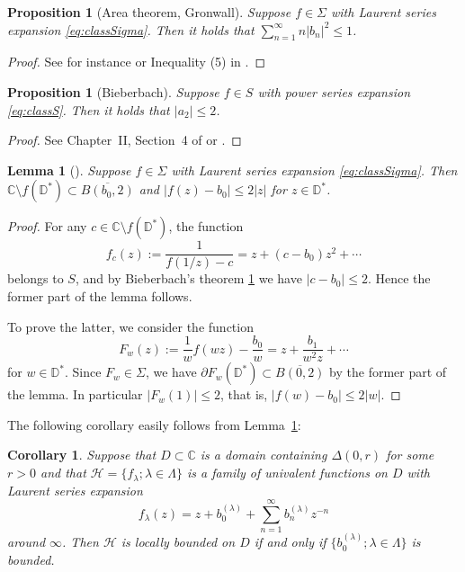 \documentclass[preprint,12pt]{elsarticle}
\newtheorem{prop}[thm]{Proposition}
\newtheorem{lem}[thm]{Lemma}
\newtheorem{cor}[thm]{Corollary}
\theoremstyle{definition}
\newcommand{\C}{\mathbb{C}}
\newcommand{\disk}{\mathbb{D}}
\begin{document}
\begin{prop}[Area theorem, Gronwall] \label{prop:areathm}
Suppose $f \in \Sigma$ with Laurent series expansion \eqref{eq:classSigma}.
Then it holds that $\sum_{n=1}^{\infty}n\lvert b_n \rvert^2 \leq 1$.
\end{prop}

\begin{proof}
See for instance \cite[Theorem~II.4.1]{Go69}
or Inequality (5) in \cite[Section~1.2]{Po75}.
\end{proof}

\begin{prop}[Bieberbach] \label{prop:Bie}
Suppose $f \in S$ with power series expansion \eqref{eq:classS}.
Then it holds that $\lvert a_2 \rvert \leq 2$.
\end{prop}

\begin{proof}
See Chapter~II, Section~4 of \cite{Go69} or \cite[Theorem~1.5]{Po75}.
\end{proof}

\begin{lem}[{\cite[Theorem~II.4.3 and Lemma~V.2.2]{Go69}}] \label{lem:Sigma}
Suppose $f \in \Sigma$ with Laurent series expansion \eqref{eq:classSigma}.
Then $\C \setminus f(\disk^*) \subset \overline{B(b_0, 2)}$
and $\lvert f(z)-b_0 \rvert \leq 2\lvert z \rvert$ for $z \in \disk^*$.
\end{lem}

\begin{proof}
For any $c \in \C \setminus f(\disk^*)$, the function
\[
f_c(z):=\frac{1}{f(1/z)-c}=z+(c-b_0)z^2+\cdots
\]
belongs to $S$, and by Bieberbach's theorem \ref{prop:Bie} we have
$\lvert c-b_0 \rvert \leq 2$.
Hence the former part of the lemma follows.

To prove the latter, we consider the function
\[
F_w(z):=\frac{1}{w}f(wz)-\frac{b_0}{w}
=z + \frac{b_1}{w^2z} + \cdots
\]
for $w \in \disk^*$. Since $F_w \in \Sigma$,
we have $\partial F_w(\disk^*) \subset \overline{B(0, 2)}$
by the former part of the lemma.
In particular $\lvert F_w(1) \rvert \leq 2$, that is,
$\lvert f(w)-b_0 \rvert \leq 2\lvert w \rvert$.
\end{proof}

The following corollary easily follows from Lemma~\ref{lem:Sigma}:

\begin{cor} \label{cor:precptSigma}
Suppose that $D \subset \C$ is a domain containing $\Delta(0, r)$
for some $r>0$ and that $\mathcal{H}=\{f_{\lambda}; \lambda \in \Lambda\}$
is a family of univalent functions on $D$ with Laurent series expansion
\[
f_{\lambda}(z)=z+b^{(\lambda)}_0+\sum_{n=1}^{\infty}b^{(\lambda)}_n z^{-n}
\]
around $\infty$.
Then $\mathcal{H}$ is locally bounded on $D$
if and only if $\{b^{(\lambda)}_0; \lambda \in \Lambda\}$ is bounded.
\end{cor}
\end{document}
